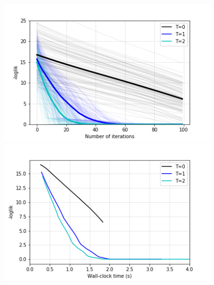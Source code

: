 \begin{figure}[h]

  \includegraphics[width=\linewidth]{img/hmm_results.png}
\endminipage
{}
  \includegraphics[width=\linewidth]{img/hmm_times.png}
\endminipage\hfill


\end{figure}
